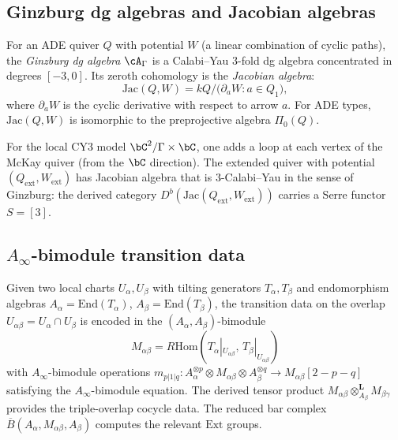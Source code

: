 \subsection{Ginzburg dg algebras and Jacobian algebras}
\label{subsec:ginzburg-dg}

\begin{definition}
\label{def:ginzburg-dg}
For an ADE quiver $Q$ with potential $W$ (a linear combination
of cyclic paths), the \emph{Ginzburg dg algebra} $\cA_\Gamma$
is a Calabi--Yau $3$-fold dg algebra concentrated in degrees
$[-3, 0]$. Its zeroth cohomology is the \emph{Jacobian algebra}:
\[
\mathrm{Jac}(Q, W) = kQ \big/ \bigl(\partial_a W : a \in Q_1\bigr),
\]
where $\partial_a W$ is the cyclic derivative with respect to
arrow $a$. For ADE types, $\mathrm{Jac}(Q,W)$ is isomorphic
to the preprojective algebra $\Pi_0(Q)$.
\end{definition}

\begin{remark}[CY3 extension]
\label{rem:cy3-extension}
For the local CY3 model $\bC^2/\Gamma \times \bC$, one adds a
loop at each vertex of the McKay quiver (from the $\bC$
direction). The extended quiver with potential $(Q_{\mathrm{ext}},
W_{\mathrm{ext}})$ has Jacobian algebra that is $3$-Calabi--Yau
in the sense of Ginzburg: the derived category
$D^b(\mathrm{Jac}(Q_{\mathrm{ext}}, W_{\mathrm{ext}}))$
carries a Serre functor $S = [3]$.
\end{remark}

\subsection{\texorpdfstring{$A_\infty$}{A-inf}-bimodule transition data}
\label{subsec:ainfty-bimodule}

\begin{construction}
\label{constr:ainfty-bimodule}
Given two local charts $U_\alpha, U_\beta$ with tilting
generators $T_\alpha, T_\beta$ and endomorphism algebras
$A_\alpha = \mathrm{End}(T_\alpha)$,
$A_\beta = \mathrm{End}(T_\beta)$, the transition data on the
overlap $U_{\alpha\beta} = U_\alpha \cap U_\beta$ is encoded
in the $(A_\alpha, A_\beta)$-bimodule
\[
M_{\alpha\beta} = R\mathrm{Hom}(T_\alpha|_{U_{\alpha\beta}},\,
T_\beta|_{U_{\alpha\beta}})
\]
with $A_\infty$-bimodule operations
$m_{p|1|q}\colon A_\alpha^{\otimes p} \otimes M_{\alpha\beta}
\otimes A_\beta^{\otimes q} \to M_{\alpha\beta}[2-p-q]$
satisfying the $A_\infty$-bimodule equation. The derived tensor
product $M_{\alpha\beta} \otimes^{\mathbf{L}}_{A_\beta}
M_{\beta\gamma}$ provides the triple-overlap cocycle data.
The reduced bar complex $\overline{B}(A_\alpha, M_{\alpha\beta},
A_\beta)$ computes the relevant $\mathrm{Ext}$ groups.
\end{construction}

